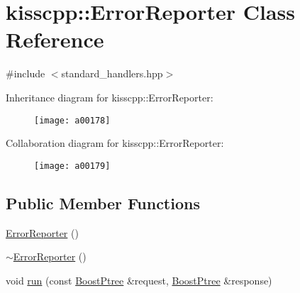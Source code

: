 \hypertarget{a00023}{\section{kisscpp\-:\-:Error\-Reporter Class Reference}
\label{a00023}
}


{\ttfamily \#include $<$standard\-\_\-handlers.\-hpp$>$}



Inheritance diagram for kisscpp\-:\-:Error\-Reporter\-:\nopagebreak
\begin{figure}[H]
\begin{center}
\leavevmode
\texttt{[image: a00178]}
\end{center}
\end{figure}


Collaboration diagram for kisscpp\-:\-:Error\-Reporter\-:\nopagebreak
\begin{figure}[H]
\begin{center}
\leavevmode
\texttt{[image: a00179]}
\end{center}
\end{figure}
\subsection*{Public Member Functions}
\begin{DoxyCompactItemize}
\item 
\hyperlink{a00023_ae772ce0549cded2acb8909b420c4b6d7}{Error\-Reporter} ()
\item 
\hyperlink{a00023_a497e32bd73503b28283b3e64fd0ac45c}{$\sim$\-Error\-Reporter} ()
\item 
void \hyperlink{a00023_a7afc458c0a447f93f138f006acb57117}{run} (const \hyperlink{a00048_ab36820650b8e0db36402aea80485633c}{Boost\-Ptree} \&request, \hyperlink{a00048_ab36820650b8e0db36402aea80485633c}{Boost\-Ptree} \&response)
\end{DoxyCompactItemize}


